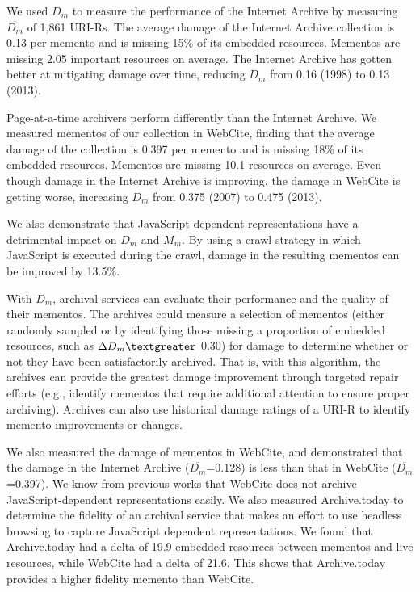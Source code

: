 We used $D_m$ to measure the performance of the Internet Archive by measuring $\overline{D_m}$ of 1,861 URI-Rs. The average damage of the Internet Archive collection is 0.13 per memento and is missing 15\% of its embedded resources. Mementos are missing 2.05 important resources on average. The Internet Archive has gotten better at mitigating damage over time, reducing $D_m$ from 0.16 (1998) to 0.13 (2013). 

Page-at-a-time archivers perform differently than the Internet Archive. We measured mementos of our collection in WebCite, finding that the average damage of the collection is 0.397 per memento and is missing 18\% of its embedded resources. Mementos are missing 10.1 resources on average. Even though damage in the Internet Archive is improving, the damage in WebCite is getting worse, increasing $D_m$ from 0.375 (2007) to 0.475 (2013). 

We also demonstrate that JavaScript-dependent representations have a detrimental impact on $D_m$ and $M_m$. By using a crawl strategy in which JavaScript is executed during the crawl, damage in the resulting mementos can be improved by 13.5\%.

With $D_m$, archival services can evaluate their performance and the quality of their mementos. The archives could measure a selection of mementos (either randomly sampled or by identifying those missing a proportion of embedded resources, such as {$\Delta D_m \textgreater$} 0.30) for damage to determine whether or not they have been satisfactorily archived. That is, with this algorithm, the archives can provide the greatest damage improvement through targeted repair efforts (e.g., identify mementos that require additional attention to ensure proper archiving). Archives can also use historical damage ratings of a URI-R to identify memento improvements or changes.

We also measured the damage of mementos in WebCite, and demonstrated that the damage in the Internet Archive ($\overline{D_m}$=0.128) is less than that in WebCite ($\overline{D_m}$=0.397). We know from previous works that WebCite does not archive JavaScript-dependent representations easily. We also measured Archive.today to determine the fidelity of an archival service that makes an effort to use headless browsing to capture JavaScript dependent representations. We found that Archive.today had a delta of 19.9 embedded resources between mementos and live resources, while WebCite had a delta of 21.6. This shows that Archive.today provides a higher fidelity memento than WebCite.

